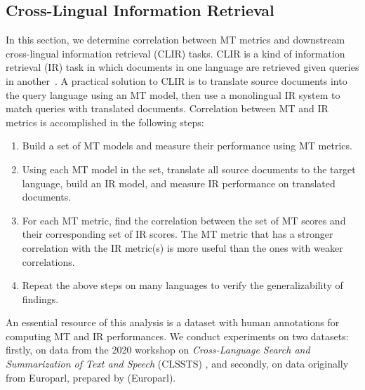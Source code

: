 \subsection{Cross-Lingual Information Retrieval}
\label{sec:clir}
In this section, we determine correlation between MT metrics and  downstream cross-lingual information retrieval (CLIR) tasks.
CLIR is a kind of information retrieval (IR) task in which documents in one language are retrieved given queries in another~\cite{grefenstette2012CLIR}. 
A practical solution to CLIR is to translate source documents into the query language using an MT model, then use a monolingual IR system to match queries with translated documents. 
Correlation between MT and IR metrics is accomplished in the following steps: 
\begin{enumerate}[noitemsep,topsep=0pt]
 \item Build a set of MT models and measure their performance using MT metrics.
 \item Using each MT model in the set, translate all source documents to the target language, build an IR model, and measure IR performance on translated documents.
 \item For each MT metric, find the correlation between the set of MT scores and their corresponding set of IR scores.
 The MT metric that has a stronger correlation with the IR metric(s) is more useful than the ones with weaker correlations.
\item Repeat the above steps on many languages to verify the generalizability of findings.
\end{enumerate}


An essential resource of this analysis is a dataset with human annotations for computing MT and IR performances.
We conduct experiments on two datasets: firstly, on data from the 2020 workshop on \textit{Cross-Language Search and Summarization of Text and Speech} (CLSSTS) \cite{clssts-2020}, and secondly, on data originally from Europarl, prepared by \citet{lignos-etal-2019-MT-IR} (Europarl).

